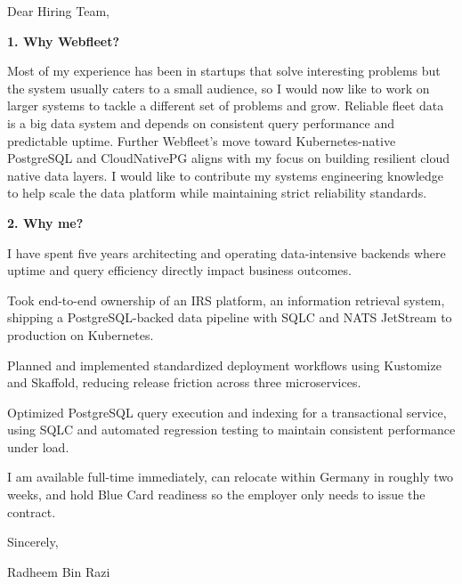 \documentclass[11pt,a4paper]{coverletter}
\begin{document}

\opening{Dear Hiring Team,}

\vspace{8pt}\noindent\textbf{1. Why Webfleet?}\par\vspace{3pt}

Most of my experience has been in startups that solve interesting problems but the system usually caters to a small audience, so I would now like to work on larger systems to tackle a different set of problems and grow. Reliable fleet data is a big data system and depends on consistent query performance and predictable uptime. Further Webfleet’s move toward Kubernetes-native PostgreSQL and CloudNativePG aligns with my focus on building resilient cloud native data layers. I would like to contribute my systems engineering knowledge to help scale the data platform while maintaining strict reliability standards.

\vspace{8pt}\noindent\textbf{2. Why me?}\par\vspace{3pt}

I have spent five years architecting and operating data-intensive backends where uptime and query efficiency directly impact business outcomes.

\bullets

  \item Took end-to-end ownership of an IRS platform, an information retrieval system, shipping a PostgreSQL-backed data pipeline with SQLC and NATS JetStream to production on Kubernetes.

  \item Planned and implemented standardized deployment workflows using Kustomize and Skaffold, reducing release friction across three microservices.

  \item Optimized PostgreSQL query execution and indexing for a transactional service, using SQLC and automated regression testing to maintain consistent performance under load.

\bulletsend

I am available full-time immediately, can relocate within Germany in roughly two weeks, and hold Blue Card readiness so the employer only needs to issue the contract.

\closing{Sincerely,}{Radheem Bin Razi}
\end{document}
